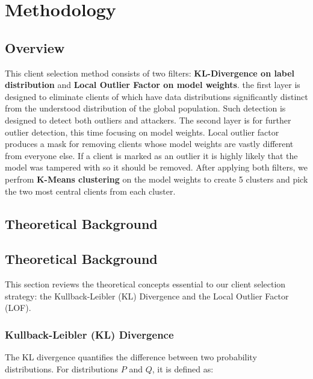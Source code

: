 \chapter{Methodology}
\section{Overview}
This client selection method consists of two filters:
\textbf{KL-Divergence on label distribution} and
\textbf{Local Outlier Factor on model weights}.
the first layer is designed to eliminate clients of which have data
distributions significantly distinct from the understood distribution of the
global population. Such detection is designed to detect both outliers and
attackers. The second layer is for further outlier detection, this time
focusing on model weights.
Local outlier factor produces a mask for removing clients whose model weights
are vastly different from everyone else. If a client is marked as an outlier it
is highly likely that the model was tampered with so it should be removed.
After applying both filters, we perfrom \textbf{K-Means clustering} on the
model weights to create 5 clusters and pick the two most central clients from
each cluster.

\section{Theoretical Background}
\section{Theoretical Background}

This section reviews the theoretical concepts essential to our client selection
strategy: the Kullback-Leibler (KL) Divergence and the Local Outlier Factor
(LOF).

\subsection{Kullback-Leibler (KL) Divergence}
The KL divergence quantifies the difference between two probability
distributions. For distributions \(P\) and \(Q\), it is defined as:

